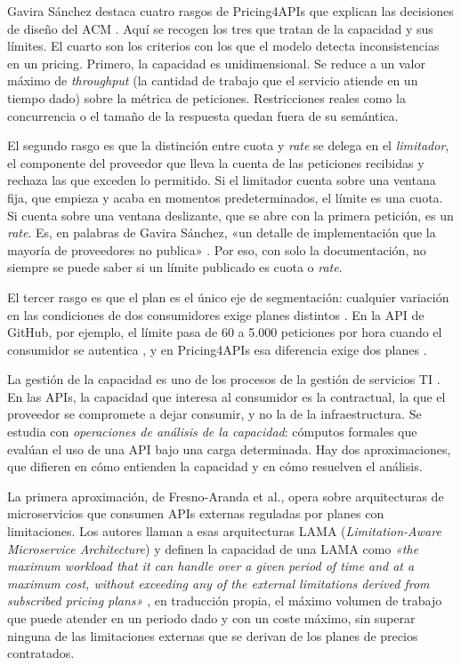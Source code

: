 Gavira Sánchez destaca cuatro rasgos de Pricing4APIs que explican las
decisiones de diseño del ACM \citep{gavira2026tfm}. Aquí se recogen los tres
que tratan de la capacidad y sus límites. El cuarto son los criterios con los
que el modelo detecta inconsistencias en un pricing. Primero, la
capacidad es unidimensional. Se reduce a un valor máximo de
\textit{throughput} (la cantidad de trabajo que el servicio atiende en un
tiempo dado) sobre la métrica de peticiones. Restricciones reales como la
concurrencia o el tamaño de la respuesta quedan fuera de su semántica.

El segundo rasgo es que la distinción entre cuota y \textit{rate} se
delega en el \textit{limitador}, el componente del proveedor que lleva la
cuenta de las peticiones recibidas y rechaza las que exceden lo
permitido. Si el limitador cuenta sobre una ventana fija, que empieza y
acaba en momentos predeterminados, el límite es una cuota. Si cuenta
sobre una ventana deslizante, que se abre con la primera petición, es un
\textit{rate}. Es, en palabras de Gavira Sánchez, «un detalle de
implementación que la mayoría de proveedores no publica»
\citep{gavira2026tfm}. Por eso, con solo la documentación, no siempre se
puede saber si un límite publicado es cuota o \textit{rate}.

El tercer rasgo es que el plan es el único eje de segmentación: cualquier
variación en las condiciones de dos consumidores exige planes distintos
\citep{fresno2025pricing4apis,gavira2026tfm}. En la API de GitHub, por
ejemplo, el límite pasa de 60 a 5.000 peticiones por hora cuando el
consumidor se autentica \citep{githubratelimits}, y en Pricing4APIs esa
diferencia exige dos planes \citep{gavira2026tfm}.

La gestión de la capacidad es uno de los procesos de la gestión de
servicios TI \citep{grummit2010capacity}. En las APIs, la capacidad que
interesa al consumidor es la contractual, la que el proveedor se
compromete a dejar consumir, y no la de la infraestructura. Se estudia
con \textit{operaciones de análisis de la capacidad}: cómputos formales
que evalúan el uso de una API bajo una carga determinada. Hay dos
aproximaciones, que difieren en cómo entienden la capacidad y en cómo
resuelven el análisis.

La primera aproximación, de Fresno-Aranda et al., opera sobre arquitecturas de
microservicios \citep{fowler2014microservices} que consumen APIs
externas reguladas por planes con limitaciones. Los autores llaman a esas
arquitecturas LAMA (\textit{Limitation-Aware Microservice Architecture}) y
definen la capacidad de una LAMA como \textit{«the maximum workload that it
can handle over a given period of time and at a maximum cost, without
exceeding any of the external limitations derived from subscribed pricing
plans»} \citep[p.~80]{fresno2023gecon}, en traducción propia, el máximo volumen de trabajo que puede
atender en un periodo dado y con un coste máximo, sin superar ninguna de las
limitaciones externas que se derivan de los planes de precios contratados.

